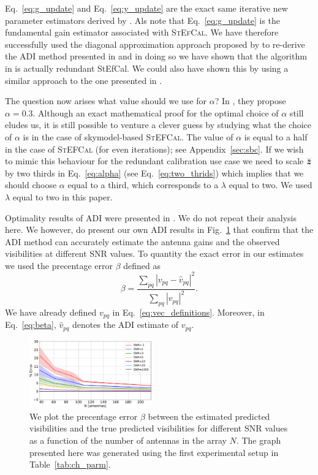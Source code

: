 \documentclass[useAMS,usenatbib]{mn2e}
\newcommand{\bz}{\bmath{z}}
\begin{document}
Eq.~\eqref{eq:g_update} and Eq.~\eqref{eq:y_update} are the exact same iterative new parameter estimators derived by \citet{Marthi2014}. Als note that Eq.~\eqref{eq:g_update} is the fundamental
gain estimator associated with \textsc{StEfCal}. We have therefore successfully used the diagonal approximation approach proposed by \citet{Smirnov2015} to re-derive the ADI method presented in 
\citet{Marthi2014} and in doing so we have shown that the algorithm in \citet{Marthi2014} is actually redundant StEfCal. We could also have shown this by using a similar approach 
to the one presented in \citet{Salvini2014}.

The question now arises what value should we use for $\alpha$? In \citet{Marthi2014}, they propose 
$\alpha = 0.3$. Although an exact mathematical proof for the optimal choice of $\alpha$ still eludes us, it is still possible to
venture a clever guess by studying what the choice of $\alpha$ is in the case of skymodel-based \textsc{StEFCal}. The value of $\alpha$ is equal to a half 
in the case of \textsc{StEFCal} (for even iterations); see Appendix~\ref{sec:sbc}. If we wish to mimic this behaviour for the redundant calibration use case we need to scale $\breve{\bz}$ by two thirds in Eq.~\eqref{eq:alpha} (see Eq.~\eqref{eq:two_thrids}) which implies that we should choose $\alpha$ equal to a third, which corresponds to a $\lambda$ equal to two.
We used $\lambda$ equal to two in this paper.

Optimality results of ADI were presented in \citet{Marthi2014}. We do not repeat their analysis here. We however, do present our own ADI results in Fig.~\ref{fig:prec_error} that confirm that the
ADI method can accurately estimate the antenna gains and the observed visibilities at different SNR values. To quantity the exact error in our estimates we used the precentage error $\beta$ defined 
as 
\begin{equation}
\label{eq:beta}
\beta = \frac{\sum_{pq} |v_{pq} - \widehat{v}_{pq} |^2}{\sum_{pq} |v_{pq}|^2}.
\end{equation}
We have already defined $v_{pq}$ in Eq.~\eqref{eq:vec_definitions}. Moreover, in Eq.~\eqref{eq:beta}, $\widehat{v}_{pq}$ denotes the ADI estimate of $v_{pq}$.  

\begin{figure}
\includegraphics[width=0.47\textwidth]{./prec_error.pdf} 
\caption{We plot the precentage error $\beta$ between the estimated 
predicted visibilities and the true predicted visibilities for different SNR values as a function of the number of antennas in the array $N$. The graph presented here was generated using the first experimental setup in Table~\ref{tab:ch_parm}.}
\label{fig:prec_error}
\end{figure}
\end{document}
